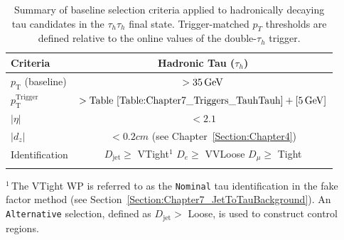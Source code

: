 {
\setlength{\arrayrulewidth}{1pt}

\begin{table}[!htbp]
\centering
\caption[Summary of baseline selection criteria for $\tau_h$ candidates in the $\tau_h\tau_h$ channel.]{
Summary of baseline selection criteria applied to hadronically decaying tau candidates in the $\tau_h\tau_h$ final state. Trigger-matched $p_T$ thresholds are defined relative to the online values of the double-$\tau_h$ trigger.}
\label{Table:Chapter7_TauhSelectionSummary}

\renewcommand{\arraystretch}{1.5}
\setlength{\tabcolsep}{12pt}

\begin{tabular}{lc}
\hline
Criteria & Hadronic Tau ($\tau_h$) \\
\hline
$p_\text{T}$ (baseline) &  $> 35 \,\text{Ge\hspace{-.08em}V}$\\
\arrayrulecolor{lightgray} \hline

$p_\text{T}^{\text{Trigger}}$ & $ > \text{Table~\ref{Table:Chapter7_Triggers_TauhTauh}} + [5\,\text{Ge\hspace{-.08em}V}]$ \\
\arrayrulecolor{lightgray} \hline

$|\eta|$ & $< 2.1$ \\
\arrayrulecolor{lightgray} \hline

$|d_z|$ & $< 0.2\unit{cm}$ (see Chapter~\ref{Section:Chapter4}) \\
\arrayrulecolor{lightgray} \hline

Identification 
& \makecell{
\normalfont\footnotesize$D_{\text{jet}} \geq$ VTight\hyperlink{Alternative-FFcut_CP}{$^1$} \\
\normalfont\footnotesize$D_{e} \geq$ VVLoose \\
\normalfont\footnotesize$D_{\mu} \geq$ Tight
} \\ 
\arrayrulecolor{black} \hline
\end{tabular}
\vspace{0.5em}
\begin{minipage}{0.95\linewidth}
\raggedright
\footnotesize
\hypertarget{Alternative-FFcut_CP}{}$^{1}$\,The VTight \ac{WP} is referred to as the \texttt{Nominal} tau identification in the fake factor method (see Section~\ref{Section:Chapter7_JetToTauBackground}). An \texttt{Alternative} selection, defined as $D_{\text{jet}} >$ Loose, is used to construct control regions.

\end{minipage}
\end{table}
}

